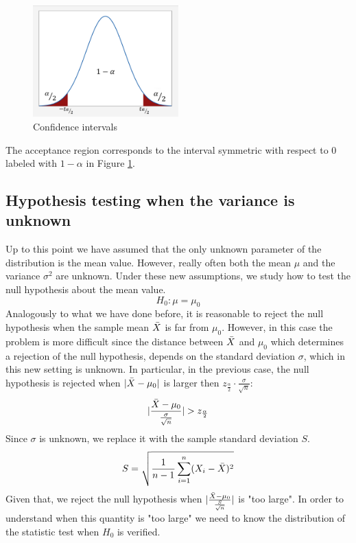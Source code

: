 \begin{figure}[H]
	\centering
	\includegraphics[width=0.5\textwidth]{
		images/06_Evaluation_normalDistributionTest.png
	}
	\caption{Confidence intervals}
	\label{fig:confidence_intervals}
\end{figure}

The acceptance region corresponds to the interval symmetric with respect to 0 labeled
with $1-\alpha$ in Figure \ref{fig:confidence_intervals}.

\subsection{Hypothesis testing when the variance is unknown}
Up to this point we have assumed that the only unknown parameter of the distribution
is the mean value. However, really often both the mean $\mu$ and the variance $\sigma
^{2}$ are unknown. Under these new assumptions, we study how to test the null hypothesis
about the mean value.
\[
	H_{0}: \mu = \mu_{0}
\]
Analogously to what we have done before, it is reasonable to reject the null hypothesis
when the sample mean $\Bar{X}$ is far from $\mu_{0}$. However, in this case the problem
is more difficult since the distance between $\Bar{X}$ and $\mu_{0}$ which determines
a rejection of the null hypothesis, depends on the standard deviation $\sigma$, which
in this new setting is unknown. In particular, in the previous case, the null
hypothesis is rejected when $|\Bar{X}-\mu_{0}|$ is larger then
$z_{\frac{\alpha}{2}}\cdot \frac{\sigma}{\sqrt{n}}$:
\[
	|\frac{\Bar{X}-\mu_{0}}{\frac{\sigma}{\sqrt{n}}}|>z_{\frac{\alpha}{2}}
\]
Since $\sigma$ is unknown, we replace it with the sample standard deviation $S$.
\begin{equation}
	S = \sqrt{\frac{1}{n-1}\sum_{i=1}^{n}(X_{i}-\Bar{X})^{2}}
\end{equation}
Given that, we reject the null hypothesis when
$|\frac{\Bar{X}-\mu_{0}}{\frac{S}{\sqrt{n}}}|$ is "too large". In order to understand
when this quantity is "too large" we need to know the distribution of the statistic
test when $H_{0}$ is verified.

